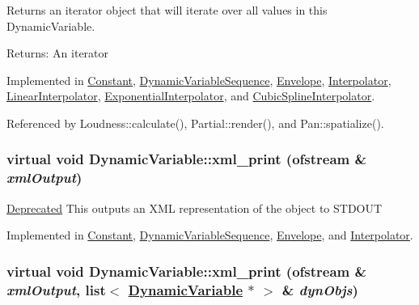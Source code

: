 Returns an iterator object that will iterate over all values in this Dynamic\-Variable. \begin{Desc}
\item[Returns:]An iterator \end{Desc}


Implemented in \hyperlink{classConstant_a4}{Constant}, \hyperlink{classDynamicVariableSequence_a24}{Dynamic\-Variable\-Sequence}, \hyperlink{classEnvelope_a26}{Envelope}, \hyperlink{classInterpolator_a3}{Interpolator}, \hyperlink{classLinearInterpolator_a2}{Linear\-Interpolator}, \hyperlink{classExponentialInterpolator_a2}{Exponential\-Interpolator}, and \hyperlink{classCubicSplineInterpolator_a2}{Cubic\-Spline\-Interpolator}.

Referenced by Loudness::calculate(), Partial::render(), and Pan::spatialize().\hypertarget{classDynamicVariable_a12}{
\subsubsection[xml\_\-print]{\setlength{\rightskip}{0pt plus 5cm}virtual void Dynamic\-Variable::xml\_\-print (ofstream \& {\em xml\-Output})}}
\label{classDynamicVariable_a12}


\begin{Desc}
\item[\hyperlink{deprecated__deprecated000008}{Deprecated}]This outputs an XML representation of the object to STDOUT \end{Desc}


Implemented in \hyperlink{classConstant_a8}{Constant}, \hyperlink{classDynamicVariableSequence_a28}{Dynamic\-Variable\-Sequence}, \hyperlink{classEnvelope_a30}{Envelope}, and \hyperlink{classInterpolator_a8}{Interpolator}.\hypertarget{classDynamicVariable_a11}{
\subsubsection[xml\_\-print]{\setlength{\rightskip}{0pt plus 5cm}virtual void Dynamic\-Variable::xml\_\-print (ofstream \& {\em xml\-Output}, list$<$ \hyperlink{classDynamicVariable}{Dynamic\-Variable} $\ast$ $>$ \& {\em dyn\-Objs})}}
\label{classDynamicVariable_a11}


